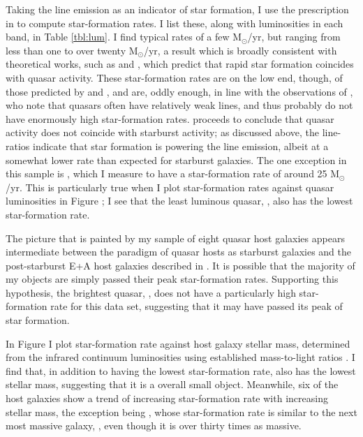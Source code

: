 Taking the line emission as an indicator of star formation, I use the prescription in \cite{Kennicutt} to compute star-formation rates. I list these, along with luminosities in each band, in Table \ref{tbl:lum}. I find typical rates of a few M$_\odot$/yr, but ranging from less than one to over twenty M$_\odot$/yr, a result which is broadly consistent with theoretical works, such as \cite{DiMatteo} and \cite{Springel}, which predict that rapid star formation coincides with quasar activity.  These star-formation rates are on the low end, though, of those predicted by \cite{DiMatteo} and \cite{Springel}, and are, oddly enough, in line with the observations of \cite{Ho}, who note that quasars often have relatively weak  lines, and thus probably do not have enormously high star-formation rates. \cite{Ho} proceeds to conclude that quasar activity does not coincide with starburst activity; as discussed above, the line-ratios indicate that star formation is powering the line emission, albeit at a somewhat lower rate than expected for starburst galaxies. The one exception in this sample is , which I measure to have a star-formation rate of around 25 M$_\odot$/yr. This is particularly true when I plot star-formation rates against quasar luminosities in Figure ; I see that the least luminous quasar, , also has the lowest star-formation rate.

The picture that is painted by my sample of eight quasar host galaxies appears intermediate between the paradigm of quasar hosts as starburst galaxies and the post-starburst E+A host galaxies described in \cite{Cales}.  It is possible that the majority of my objects are simply passed their peak star-formation rates. Supporting this hypothesis, the brightest quasar, , does not have a particularly high star-formation rate for this data set, suggesting that it may have passed its peak of star formation.


In Figure  I plot star-formation rate against host galaxy stellar mass, determined from the infrared continuum luminosities using established mass-to-light ratios \citep{Bell}. I find that, in addition to having the lowest star-formation rate,  also has the lowest stellar mass, suggesting that it is a overall small object. Meanwhile, six of the host galaxies show a trend of increasing star-formation rate with increasing stellar mass, the exception being , whose star-formation rate is similar to the next most massive galaxy, , even though it is over thirty times as massive.

